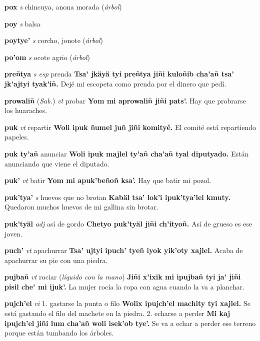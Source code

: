 \documentclass[10pt]{scrbook}
\newcommand{\entry}[1]{\textbf{#1}}
\newcommand{\onedefinition}[1]{#1.}
\newcommand{\partofspeech}[1]{\textit{#1}}
\newcommand{\spanishtranslation}[1]{#1}
\newcommand{\clarification}[1]{(\textit{#1})}
\newcommand{\cholexample}[1]{\textbf{#1}}
\newcommand{\exampletranslation}[1]{#1}
\newcommand{\relevantdialect}[1]{(\textit{#1})}
\begin{document}
\begin{multicols}{2}
\entry{pox}
\partofspeech{s}
\spanishtranslation{chincuya, anona morada}
\clarification{árbol}

\entry{poy}
\partofspeech{s}
\spanishtranslation{balsa}

\entry{poytye'}
\partofspeech{s}
\spanishtranslation{corcho, jonote}
\clarification{árbol}

\entry{po'om}
\partofspeech{s}
\spanishtranslation{ocote agrio}
\clarification{árbol}

\entry{preñtya}
\partofspeech{s esp}
\spanishtranslation{prenda}
\cholexample{Tsa' jkäyä tyi preñtya jiñi kuloñib cha'añ tsa' jk'ajtyi tyak'iñ.}
\exampletranslation{Dejé mi escopeta como prenda por el dinero que pedí.}

\entry{prowaliñ}
\relevantdialect{Sab.}
\partofspeech{vt}
\spanishtranslation{probar}
\cholexample{Yom mi aprowaliñ jiñi pats'.}
\exampletranslation{Hay que probrarse los huaraches.}

\entry{puk}
\partofspeech{vt}
\spanishtranslation{repartir}
\cholexample{Woli ipuk ñumel juñ jiñi komityé.}
\exampletranslation{El comité está repartiendo papeles.}

\entry{puk ty'añ}
\spanishtranslation{anunciar}
\cholexample{Woli ipuk majlel ty'añ cha'añ tyal diputyado.}
\exampletranslation{Están anunciando que viene el diputado.}

\entry{puk'}
\partofspeech{vt}
\spanishtranslation{batir}
\cholexample{Yom mi apuk'beñoñ ksa'.}
\exampletranslation{Hay que batir mi pozol.}

\entry{puk'tya'}
\partofspeech{s}
\spanishtranslation{huevos que no brotan}
\cholexample{Kabäl tsa' lok'i ipuk'tya'lel kmuty.}
\exampletranslation{Quedaron muchos huevos de mi gallina sin brotar.}

\entry{puk'tyäl}
\partofspeech{adj}
\spanishtranslation{así de gordo}
\cholexample{Chetyo puk'tyäl jiñi ch'ityoñ.}
\exampletranslation{Así de grueso es ese joven.}

\entry{puch'}
\partofspeech{vt}
\spanishtranslation{apachurrar}
\cholexample{Tsa' ujtyi ipuch' tyeñ iyok yik'oty xajlel.}
\exampletranslation{Acaba de apachurrar su pie con una piedra.}

\entry{pujbañ}
\partofspeech{vt}
\spanishtranslation{rociar}
\clarification{líquido con la mano}
\cholexample{Jiñi x'ixik mi ipujbañ tyi ja' jiñi pisil che' mi ijuk'.}
\exampletranslation{La mujer rocía la ropa con agua cuando la va a planchar.}

\entry{pujch'el}
\partofspeech{vi}
\onedefinition{1}
\spanishtranslation{gastarse la punta o filo}
\cholexample{Wolix ipujch'el machity tyi xajlel.}
\exampletranslation{Se está gastando el filo del machete en la piedra.}
\onedefinition{2}
\spanishtranslation{echarse a perder}
\cholexample{Mi kaj ipujch'el jiñi lum cha'añ woli isek'ob tye'.}
\exampletranslation{Se va a echar a perder ese terreno porque están tumbando los árboles.}


\end{multicols}
\end{document}
